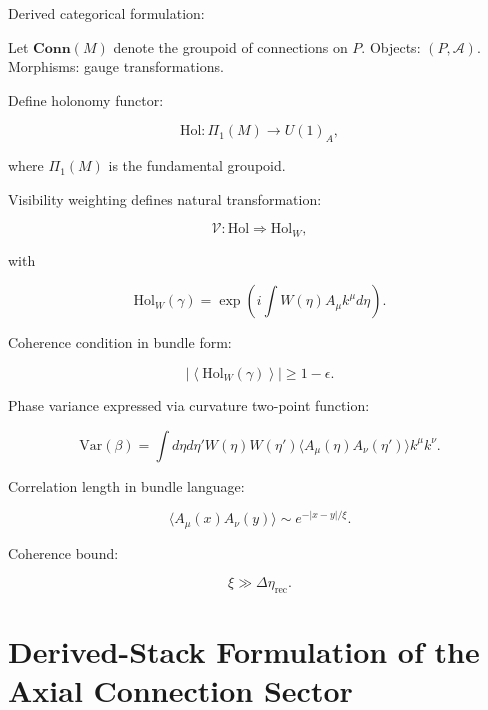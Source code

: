 \documentclass[12pt]{article}
\begin{document}
Derived categorical formulation:

Let $\mathbf{Conn}(M)$ denote the groupoid of connections on $P$.
Objects: $(P,\mathcal{A})$.
Morphisms: gauge transformations.

Define holonomy functor:

\begin{equation}
\mathrm{Hol}:
\Pi_1(M)
\to
U(1)_A,
\end{equation}

where $\Pi_1(M)$ is the fundamental groupoid.

Visibility weighting defines natural transformation:

\begin{equation}
\mathcal{V}:
\mathrm{Hol}
\Rightarrow
\mathrm{Hol}_W,
\end{equation}

with

\begin{equation}
\mathrm{Hol}_W(\gamma)
=
\exp
\left(
i \int W(\eta) A_\mu k^\mu d\eta
\right).
\end{equation}

Coherence condition in bundle form:

\begin{equation}
\left|
\left\langle
\mathrm{Hol}_W(\gamma)
\right\rangle
\right|
\ge
1-\epsilon.
\end{equation}

Phase variance expressed via curvature two-point function:

\begin{equation}
\mathrm{Var}(\beta)
=
\int d\eta d\eta'
W(\eta)W(\eta')
\langle
A_\mu(\eta) A_\nu(\eta')
\rangle
k^\mu k^\nu.
\end{equation}

Correlation length in bundle language:

\begin{equation}
\langle
A_\mu(x) A_\nu(y)
\rangle
\sim
e^{-|x-y|/\xi}.
\end{equation}

Coherence bound:

\begin{equation}
\xi
\gg
\Delta\eta_{\mathrm{rec}}.
\end{equation}

\section{Derived-Stack Formulation of the Axial Connection Sector}
\end{document}
